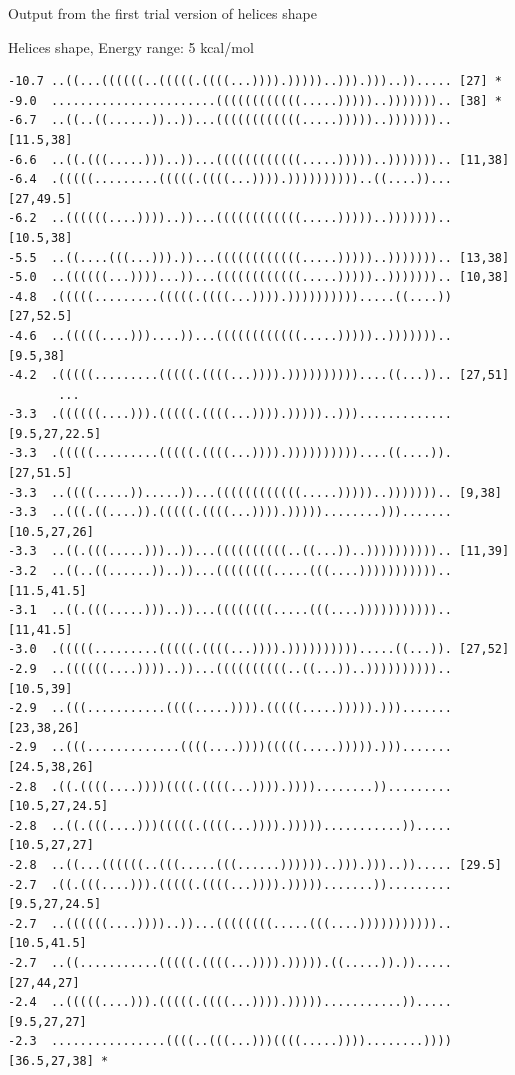 \documentclass[ignorenonframetext,10pt]{beamer}
\begin{document}
\begin{frame}[fragile]
  Output from the first trial version of helices shape
  \begin{block}{\tiny Helices shape, Energy range: 5 kcal/mol}
  \tiny
  \begin{verbatim}
-10.7 ..((...((((((..(((((.((((...)))).)))))..))).)))..))..... [27] *
-9.0  .......................((((((((((((.....)))))..))))))).. [38] *
-6.7  ..((..((......))..))...((((((((((((.....)))))..))))))).. [11.5,38]
-6.6  ..((.(((.....)))..))...((((((((((((.....)))))..))))))).. [11,38]
-6.4  .(((((.........(((((.((((...)))).))))))))))..((....))... [27,49.5]
-6.2  ..((((((....))))..))...((((((((((((.....)))))..))))))).. [10.5,38]
-5.5  ..((....(((...))).))...((((((((((((.....)))))..))))))).. [13,38]
-5.0  ..((((((...))))...))...((((((((((((.....)))))..))))))).. [10,38]
-4.8  .(((((.........(((((.((((...)))).)))))))))).....((....)) [27,52.5]
-4.6  ..(((((....)))....))...((((((((((((.....)))))..))))))).. [9.5,38]
-4.2  .(((((.........(((((.((((...)))).))))))))))....((...)).. [27,51]
       ...
-3.3  .((((((....))).(((((.((((...)))).)))))..)))............. [9.5,27,22.5]
-3.3  .(((((.........(((((.((((...)))).))))))))))....((....)). [27,51.5]
-3.3  ..((((.....)).....))...((((((((((((.....)))))..))))))).. [9,38]
-3.3  ..(((.((....)).(((((.((((...)))).)))))........)))....... [10.5,27,26]
-3.3  ..((.(((.....)))..))...((((((((((..((...))..)))))))))).. [11,39]
-3.2  ..((..((......))..))...((((((((.....(((....))))))))))).. [11.5,41.5]
-3.1  ..((.(((.....)))..))...((((((((.....(((....))))))))))).. [11,41.5]
-3.0  .(((((.........(((((.((((...)))).)))))))))).....((...)). [27,52]
-2.9  ..((((((....))))..))...((((((((((..((...))..)))))))))).. [10.5,39]
-2.9  ..(((...........((((.....)))).(((((.....))))).)))....... [23,38,26]
-2.9  ..(((.............((((....))))(((((.....))))).)))....... [24.5,38,26]
-2.8  .((.((((....))))((((.((((...)))).))))........))......... [10.5,27,24.5]
-2.8  ..((.(((....)))(((((.((((...)))).)))))...........))..... [10.5,27,27]
-2.8  ..((...((((((..(((.....(((......))))))..))).)))..))..... [29.5]
-2.7  .((.(((....))).(((((.((((...)))).))))).......))......... [9.5,27,24.5]
-2.7  ..((((((....))))..))...((((((((.....(((....))))))))))).. [10.5,41.5]
-2.7  ..((...........(((((.((((...)))).))))).((.....)).))..... [27,44,27]
-2.4  ..(((((....))).(((((.((((...)))).)))))...........))..... [9.5,27,27]
-2.3  ................((((..(((...)))((((.....))))........)))) [36.5,27,38] *
  \end{verbatim} 
  \end{block}
\end{frame}
\end{document}
